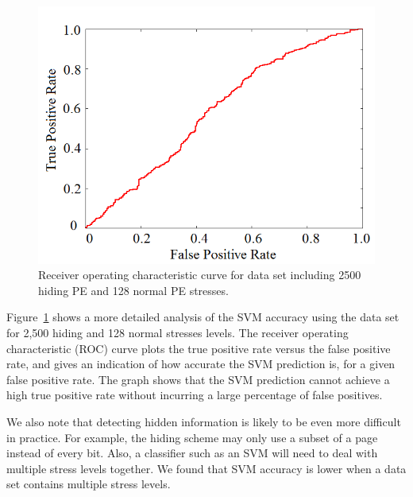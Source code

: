 \begin{figure} 
\begin{center} 
\includegraphics[width=\mywidth]{figs/roc2500128.png} 
\caption{Receiver operating characteristic curve for data set including 2500
hiding PE and 128 normal PE stresses.}
\label{fig:roc2500-128} 
\vspace{-0.1in}

\end{center} 
\end{figure}

Figure~\ref{fig:roc2500-128} shows a more detailed analysis of the SVM accuracy
using the data set for 2,500 hiding and 128 normal stresses levels.
The receiver operating characteristic (ROC) curve plots the true
positive rate versus the false positive rate, and gives an indication of how
accurate the SVM prediction is, for a given false positive rate. 
The graph shows that the SVM prediction cannot
achieve a high true positive rate without incurring a large percentage of false
positives.

We also note that detecting hidden information is likely to be even more difficult
in practice. For example, the hiding scheme may only use a subset of a page instead
of every bit. Also, a classifier such as an SVM will need to deal with multiple 
stress levels together. We found that SVM accuracy is lower when a data set
contains multiple stress levels.

